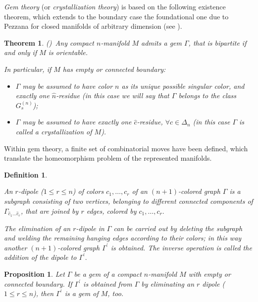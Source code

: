 \documentclass[12pt,a4paper]{article}
\newtheorem{theorem}[lemma]{Theorem}
\newtheorem{proposition}[lemma]{Proposition}
\newtheorem{definition}{Definition}
\newcommand{\G}{\Gamma}
\begin{document}
\medskip

{\it Gem theory} (or {\it crystallization theory}) is based on the following existence theorem, which extends to the boundary case the foundational one due to Pezzana for closed manifolds of arbitrary dimension (see \cite{Ferri-Gagliardi-Grasselli}).

\begin{theorem}{\em (\cite{Casali-Cristofori-Grasselli})}\ \label{Theorem_gem}  
Any compact $n$-manifold $M$ 
admits a gem $\G$, that is bipartite if and only if $M$ is orientable.
\par \noindent In particular, if  $M$ has empty or connected boundary: 
\begin{itemize}
\item $\G$ may be assumed to have color $n$ as its unique possible singular color, and exactly one $\hat n$-residue (in this case we will say that $\G$ belongs to the class $G^{(n)}_s$);
\item $\G$ may be assumed to have exactly one $\hat c$-residue, $\forall c \in \Delta_n$ (in this case $\G$ is  called  
a \emph{crystallization} of $M$).
\end{itemize}
\end{theorem}

\medskip

Within gem theory, a finite set of combinatorial moves have been defined, which translate the homeomorphism problem of the represented manifolds. 

\begin{definition}\label{def_dipole} {\em An {\it $r$-dipole ($1\le r\le n$) of colors $c_1,\ldots,c_r$} of an $(n+1)$-colored graph $\G$ is a subgraph consisting of two vertices, belonging to different connected components of $\Gamma_{\hat c_1\ldots\hat c_r}$, that are joined by $r$ edges, colored by $c_1,\ldots,c_r.$

The {\it elimination} of an $r$-dipole in $\Gamma$ can be carried out by deleting the subgraph and welding the remaining hanging edges according to their colors; in this way another $(n+1)$-colored graph $\Gamma^\prime$ is obtained. The inverse operation is called the {\it addition} of the dipole to $\Gamma^\prime.$  }
\end{definition}

\begin{proposition}
Let $\G$ be a gem of a compact $n$-manifold $M$ with empty or connected boundary.  If $\Gamma^\prime$ is obtained from $\Gamma$ by eliminating an $r$ dipole ($1\le r\le n$), then $\Gamma^\prime$ is a gem of $M$, too. 
\end{proposition}
\end{document}
